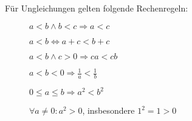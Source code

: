 Für Ungleichungen gelten folgende Rechenregeln:
\begin{description}
    \item[] $a < b \land b < c \Longrightarrow a < c$
    \item[] $a < b \Longleftrightarrow a + c < b + c$
    \item[] $a < b \land c > 0 \Longrightarrow ca < cb$
    \item[] $a < b < 0 \Longrightarrow \frac{1}{a} < \frac{1}{b}$
    \item[] $0 \leq a \leq b \Longrightarrow a^2 < b^2$
    \item[] $\forall a \neq 0 : a^2 > 0$, insbesondere $1^2 = 1 > 0$
\end{description}